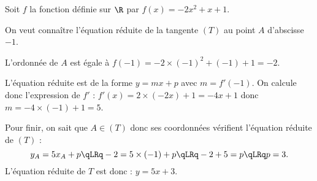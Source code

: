 \documentclass[10pt,openright,twoside,french]{book}
\begin{document}
\begin{Exemple}
    Soit $f$ la fonction définie sur $\R$ par $f(x) = -2x^2 + x + 1$.\par
    On veut connaître l'équation réduite de la tangente $(T)$ au point $A$ d'abscisse $-1$.\par\smallskip
    L'ordonnée de $A$ est égale à $f(-1) = -2 \times (-1)^2 + (-1) + 1 = -2$.\par\smallskip
    L'équation réduite est de la forme $y = mx + p$ avec $m = f'(-1)$. On calcule donc l'expression de $f'$ :
        $f'(x) = 2 \times (-2x) + 1 = -4x + 1$ donc $m = -4 \times (-1) + 1 = 5$.\par\smallskip
    Pour finir, on sait que $A\in (T)$ donc ses coordonnées vérifient l'équation réduite de $(T)$ :
    \[y_A = 5x_A + p \qLRq -2 = 5 \times (-1) + p \qLRq -2 + 5 = p \qLRq p = 3.\]
    L'équation réduite de $T$ est donc : $y = 5x + 3$.
\end{Exemple}
    \begin{center}
    \end{center}
\end{document}

